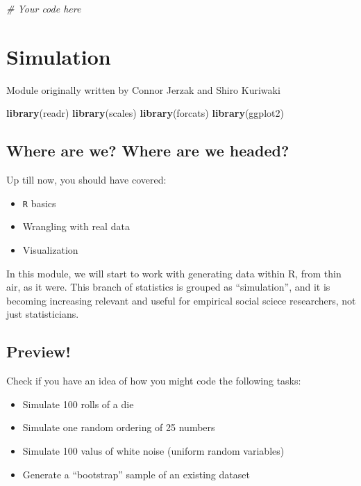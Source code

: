 \documentclass[]{book}
\newenvironment{Shaded}{\begin{snugshade}}{\end{snugshade}}
\newcommand{\KeywordTok}[1]{\textcolor[rgb]{0.13,0.29,0.53}{\textbf{#1}}}
\newcommand{\CommentTok}[1]{\textcolor[rgb]{0.56,0.35,0.01}{\textit{#1}}}
\newcommand{\NormalTok}[1]{#1}
\providecommand{\tightlist}{%
  \setlength{\itemsep}{0pt}\setlength{\parskip}{0pt}}
\theoremstyle{definition}
\theoremstyle{definition}
\theoremstyle{definition}
\theoremstyle{remark}
\begin{document}
\begin{Shaded}
\begin{Highlighting}[]
\CommentTok{# Your code here}
\end{Highlighting}
\end{Shaded}

\chapter{Simulation}\label{simulation}

Module originally written by Connor Jerzak and Shiro Kuriwaki

\begin{Shaded}
\begin{Highlighting}[]
\KeywordTok{library}\NormalTok{(readr)}
\KeywordTok{library}\NormalTok{(scales)}
\KeywordTok{library}\NormalTok{(forcats)}
\KeywordTok{library}\NormalTok{(ggplot2)}
\end{Highlighting}
\end{Shaded}

\section{Where are we? Where are we
headed?}\label{where-are-we-where-are-we-headed-4}

Up till now, you should have covered:

\begin{itemize}
\tightlist
\item
  \texttt{R} basics
\item
  Wrangling with real data
\item
  Visualization
\end{itemize}

In this module, we will start to work with generating data within R,
from thin air, as it were. This branch of statistics is grouped as
``simulation'', and it is becoming increasing relevant and useful for
empirical social sciece researchers, not just statisticians.

\section{Preview!}\label{preview}

Check if you have an idea of how you might code the following tasks:

\begin{itemize}
\tightlist
\item
  Simulate 100 rolls of a die
\item
  Simulate one random ordering of 25 numbers
\item
  Simulate 100 valus of white noise (uniform random variables)
\item
  Generate a ``bootstrap'' sample of an existing dataset
\end{itemize}
\end{document}
